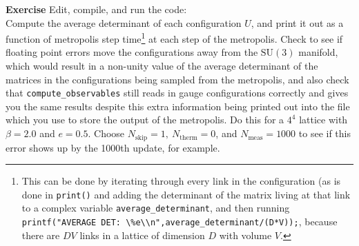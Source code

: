 \documentclass[11pt]{article}
\newcounter{exerciseno}
\DeclareRobustCommand{\exCnt}{\refstepcounter{exerciseno}\theexerciseno}
\begin{document}
\begin{tcolorbox}\textbf{Exercise \exCnt} Edit, compile, and run the code:\\
Compute the average determinant of each configuration $U$, and print it out as a function of metropolis step time\footnote{This can be done by iterating through every link in the configuration (as is done in \lstinline{print()} and adding the determinant of the matrix living at that link to a complex variable \lstinline{average_determinant}, and then running \lstinline{printf("AVERAGE DET: \%e\\n",average_determinant/(D*V));}, because there are $DV$ links in a lattice of dimension $D$ with volume $V$.} at each step of the metropolis. Check to see if floating point errors move the configurations away from the $\mathrm{SU}(3)$ manifold, which would result in a non-unity value of the average determinant of the matrices in the configurations being sampled from the metropolis, and also check that \lstinline{compute_observables} still reads in gauge configurations correctly and gives you the same results despite this extra information being printed out into the file which you use to store the output of the metropolis. Do this for a $4^4$ lattice with $\beta=2.0$ and $e=0.5$. Choose $N_{\mathrm{skip}}=1,\ N_{\mathrm{therm}}=0$, and $N_{\mathrm{meas}}=1000$ to see if this error shows up by the 1000th update, for example.
\end{tcolorbox}
\end{document}
